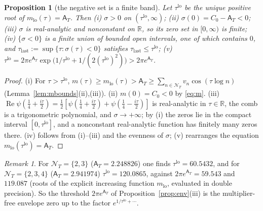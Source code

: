 \documentclass[11pt]{amsart}
\newtheorem{proposition}[theorem]{Proposition}
\theoremstyle{definition}
\theoremstyle{remark}
\newtheorem{remark}[theorem]{Remark}
\newcommand{\R}{\mathbb R}
\newcommand{\Rel}{\operatorname{Re}}
\newcommand{\NT}{\mathcal N_T}
\newcommand{\Aconst}{\mathsf A_T}
\begin{document}
\begin{proposition}[the negative set is a finite band]\label{prop:band}
Let $\tau^{\mathrm{lo}}$ be the unique positive root of $m_{\mathrm{lo}}(\tau)=\Aconst$. Then
\emph{(i)} $\sigma>0$ on $(\tau^{\mathrm{lo}},\infty)$;
\emph{(ii)} $\sigma(0)=C_0-\Aconst<0$;
\emph{(iii)} $\sigma$ is real-analytic and nonconstant on $\R$, so its zero set in $[0,\infty)$ is finite;
\emph{(iv)} $\{\sigma<0\}$ is a finite union of bounded open intervals, one of which contains $0$, and
$\tau_{\mathrm{last}}:=\sup\{\tau:\sigma(\tau)<0\}$ satisfies $\tau_{\mathrm{last}}\le\tau^{\mathrm{lo}}$;
\emph{(v)} $\tau^{\mathrm{lo}}=2\pi e^{\Aconst}\exp\big(1/\tau^{\mathrm{lo}}+1/(2(\tau^{\mathrm{lo}})^2)\big)>2\pi e^{\Aconst}$.
\end{proposition}
\begin{proof}
(i) For $\tau>\tau^{\mathrm{lo}}$, $m(\tau)\ge m_{\mathrm{lo}}(\tau)>\Aconst\ge\sum_{n\in\NT}v_n\cos(\tau\log n)$
(Lemma~\ref{lem:mbounds}(ii),(iii)). (ii) $m(0)=C_0<0$ by \eqref{eq:m}. (iii)
$\Rel\psi(\frac14+\frac{i\tau}2)=\frac12[\psi(\frac14+\frac{i\tau}2)+\psi(\frac14-\frac{i\tau}2)]$ is real-analytic in
$\tau\in\R$, the comb is a trigonometric polynomial, and $\sigma\to+\infty$; by (i) the zeros lie in the
compact interval $[0,\tau^{\mathrm{lo}}]$, and a nonconstant real-analytic function has finitely many zeros there.
(iv) follows from (i)--(iii) and the evenness of $\sigma$; (v) rearranges the equation
$m_{\mathrm{lo}}(\tau^{\mathrm{lo}})=\Aconst$.
\end{proof}

\begin{remark}\label{rem:bandvalues}
For $\NT=\{2,3\}$ ($\Aconst=2.248826$) one finds $\tau^{\mathrm{lo}}=60.5432$, and for $\NT=\{2,3,4\}$
($\Aconst=2.941974$) $\tau^{\mathrm{lo}}=120.0865$, against $2\pi e^{\Aconst}=59.543$ and $119.087$ (roots of the
explicit increasing function $m_{\mathrm{lo}}$, evaluated in double precision). So the threshold
$2\pi e^{\Aconst}$ of Proposition~\ref{prop:env}(iii) is the multiplier-free envelope zero up to the factor
$e^{1/\tau^{\mathrm{lo}}+\cdots}$.
\end{remark}
\end{document}
